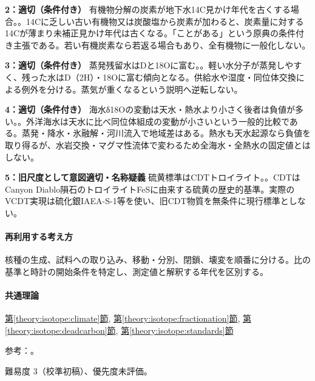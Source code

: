 \noindent\textbf{2：適切（条件付き）} 有機物分解の炭素が地下水14C見かけ年代を古くする場合。。14Cに乏しい古い有機物又は炭酸塩から炭素が加わると、炭素量に対する14Cが薄まり未補正見かけ年代は古くなる。「ことがある」という原典の条件付き主張である。若い有機炭素なら若返る場合もあり、全有機物に一般化しない。\par

\noindent\textbf{3：適切（条件付き）} 蒸発残留水はDと18Oに富む。。軽い水分子が蒸発しやすく、残った水はD（2H）・18Oに富む傾向となる。供給水や湿度・同位体交換による例外を分ける。蒸気が重くなるという説明へ逆転しない。\par

\noindent\textbf{4：適切（条件付き）} 海水δ18Oの変動は天水・熱水より小さく後者は負値が多い。。外洋海水は天水に比べ同位体組成の変動が小さいという一般的比較である。蒸発・降水・氷融解・河川流入で地域差はある。熱水も天水起源なら負値を取り得るが、水岩交換・マグマ性流体で変わるため全海水・全熱水の固定値とはしない。\par

\noindent\textbf{5：旧尺度として意図適切・名称疑義} 硫黄標準はCDTトロイライト。。CDTはCanyon Diablo隕石のトロイライトFeSに由来する硫黄の歴史的基準。実際のVCDT実現は硫化銀IAEA-S-1等を使い、旧CDT物質を無条件に現行標準としない。\par

\paragraph{再利用する考え方} 核種の生成、試料への取り込み、移動・分別、閉鎖、壊変を順番に分ける。比の基準と時計の開始条件を特定し、測定値と解釈する年代を区別する。

\paragraph{共通理論} \hyperref[theory:isotope:climate]{第\ref*{theory:isotope:climate}節}, \hyperref[theory:isotope:fractionation]{第\ref*{theory:isotope:fractionation}節}, \hyperref[theory:isotope:deadcarbon]{第\ref*{theory:isotope:deadcarbon}節}, \hyperref[theory:isotope:standards]{第\ref*{theory:isotope:standards}節}

\par 参考：\cite{iso_oxygen,iso_deadcarbon,iso_standards1995,iso_vcdt,iso_hydrothermal}。

\par 難易度 3（校準初稿）、優先度未評価。
